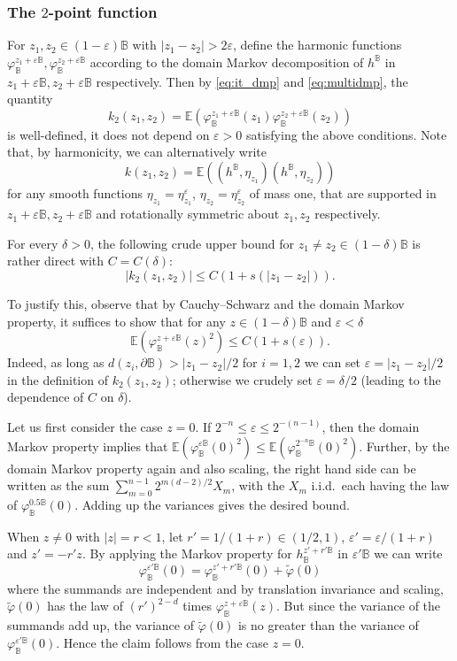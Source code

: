 \documentclass[JEP,XML,SOM,Unicode,published]{cedram}
\theoremstyle{definition}
\newcommand{\E}{\mathbb{E}}
\newcommand{\B}{\mathbb{B}}\let\D\B\let\Ub\B
\let\eps\varepsilon
\begin{document}
\subsubsection*{The $2$-point function} For $z_1,z_2\in (1-\eps)\B$ with $|z_1-z_2|>2\eps$, define the harmonic functions $\varphi_\B^{z_1+\eps\B}, \varphi_\B^{z_2+\eps\B}$ according to the domain Markov decomposition of $h^\B$ in $z_1+\eps\B,z_2+\eps\B$ respectively. Then by \eqref{eq:it_dmp} and \eqref{eq:multidmp}, the quantity
\[
k_2(z_1,z_2)=\E(\varphi_\B^{z_1+\eps\B}(z_1)\varphi_\B^{z_2+\eps\B}(z_2))
\]
is well-defined, \ie it does not depend on $\eps > 0$ satisfying the above conditions. Note that, by harmonicity, we can alternatively write
\begin{equation}\label{k:conv}k(z_1,z_2)=\E((h^\B,\eta_{z_1})(h^\B,\eta_{z_2}))\end{equation} for any smooth functions { $\eta_{z_1}=\eta_{z_1}^\eps$, $\eta_{z_2}=\eta_{z_2}^\eps$ }of mass one, that are supported in $z_1+\eps\B,z_2+\eps\B$ and rotationally symmetric about $z_1,z_2$ respectively.

For every $\delta > 0$, the following crude upper bound for $z_1\ne z_2\in (1-\delta)\B$ is rather direct with $C = C(\delta)$:
\begin{equation}\label{eq:var_bounds} |k_2(z_1,z_2)|\le C(1+s(|z_1-z_2|)). \end{equation}

To justify this, observe that by Cauchy--Schwarz and the domain Markov property, it suffices to show that for any $z\in (1-\delta)\B$ and $\eps < \delta$
\begin{equation}\label{eq:circlebound} \E(\varphi_\B^{z+\eps\B}(z)^2)\le C(1+s(\eps)).\end{equation}
Indeed, as long as $d(z_i,\partial \D)>|z_1-z_2|/2$ for $i=1,2$ we can set $\eps=|z_1-z_2|/2$ in the definition of $k_2(z_1,z_2)$; otherwise we crudely set $\eps = \delta/2$ (leading to the dependence of $C$ on $\delta$).

Let us first consider the case $z=0$. If $2^{-n}\le \eps\le 2^{-(n-1)}$, then the domain Markov property implies that $\E(\varphi_\B^{\eps\B}(0)^2)\le \E(\varphi_\B^{2^{-n}\B}(0)^2)$. Further, by the domain Markov property again and also scaling, the right hand side can be written as the sum $\sum_{m=0}^{n-1} 2^{m(d-2)/2} X_m$, with the $X_m$ i.i.d.\ each having the law of $\varphi_{\B}^{0.5\B}(0)$. Adding up the variances gives the desired bound.

When $z\ne 0$ with $|z|=r<1$, let $r' = 1/(1+r)\in (1/2,1)$, $\eps' = \eps/(1+r)$ and $z'=-r'z$.
By applying the Markov property for $h_\B^{z'+r'\B}$ in $\eps'\B$ we can write
\[
\varphi_\B^{\eps'\B}(0) = \varphi_\B^{z' +r'\B}(0) + \tilde{\varphi}(0)
\]
where the summands are independent and by translation invariance and scaling, $\tilde{\varphi}(0)$ has the law of $(r')^{2-d}$ times $\varphi_\B^{z+\eps\B}(z)$. But since the variance of the summands add up, the variance of $\tilde{\varphi}(0)$ is no greater than the variance of $\varphi_\B^{\eps'\B}(0)$. Hence the claim follows from the case $z = 0$.
\end{document}
